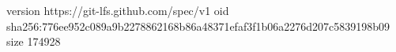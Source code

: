 version https://git-lfs.github.com/spec/v1
oid sha256:776ee952c089a9b2278862168b86a48371efaf3f1b06a2276d207c5839198b09
size 174928
